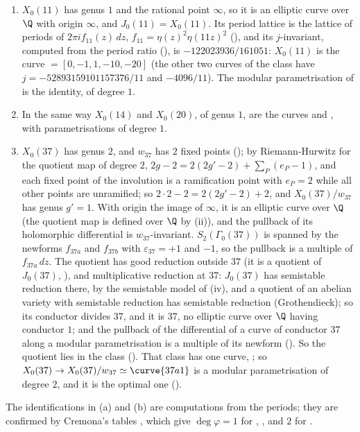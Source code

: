 \begin{example}\label{ex:moddeg:small-levels}
\leavevmode
\begin{enumerate}[label=(\alph*)]
\item $X_0(11)$ has genus $1$ and the rational point $\infty$, so it is an elliptic curve over $\Q$ with origin $\infty$, and $J_0(11)=X_0(11)$. Its period
lattice is the lattice of periods of $2\pi if_{11}(z)\,dz$, $f_{11}=\eta(z)^2\eta(11z)^2$ (), and its $j$-invariant, computed from the period
ratio (), is $-122023936/161051$: $X_0(11)$ is the curve  $=[0,-1,1,-10,-20]$ (the other two curves of the class have
$j=-52893159101157376/11$ and $-4096/11$). The modular parametrisation of  is the identity, of degree $1$.
\item In the same way $X_0(14)$ and $X_0(20)$, of genus $1$, are the curves  and , with parametrisations of degree $1$.
\item $X_0(37)$ has genus $2$, and $w_{37}$ has $2$ fixed points (); by Riemann-Hurwitz for the quotient map of degree $2$, $2g-2=2(2g'-2)+\sum_P(e_P-1)$, and each fixed point of the involution is a ramification point with
$e_P=2$ while all other points are unramified; so $2\cdot2-2=2(2g'-2)+2$, and $X_0(37)/w_{37}$ has genus
$g'=1$. With origin the image of $\infty$, it is an elliptic curve over $\Q$ (the quotient map is defined over $\Q$ by (ii)), and the
pullback of its holomorphic differential is $w_{37}$-invariant. $S_2(\Gamma_0(37))$ is spanned by the newforms $f_{37a}$ and $f_{37b}$ with $\varepsilon_{37}=+1$ and $-1$, so the
pullback is a multiple of $f_{37a}\,dz$. The quotient has good reduction outside $37$ (it is a quotient of $J_0(37)$, ), and multiplicative reduction at $37$: $J_0(37)$
has semistable reduction there, by the semistable model of (iv), and a quotient of an abelian variety with semistable reduction has
semistable reduction (Grothendieck); so its conductor divides $37$, and it is $37$, no elliptic curve over $\Q$ having conductor $1$; and the pullback of the differential of a curve of conductor $37$ along a modular parametrisation is a
multiple of its newform (). So the quotient lies in the class  (). That class has one curve,
; so $X_0(37)\to X_0(37)/w_{37}\simeq\curve{37a1}$ is a modular parametrisation of degree $2$, and it is the optimal one ().
\end{enumerate}
The identifications in (a) and (b) are computations from the periods; they are confirmed by Cremona's tables \cite{Cremona97,ecdata}, which give
$\deg\varphi=1$ for , ,  and $2$ for .
\end{example}

